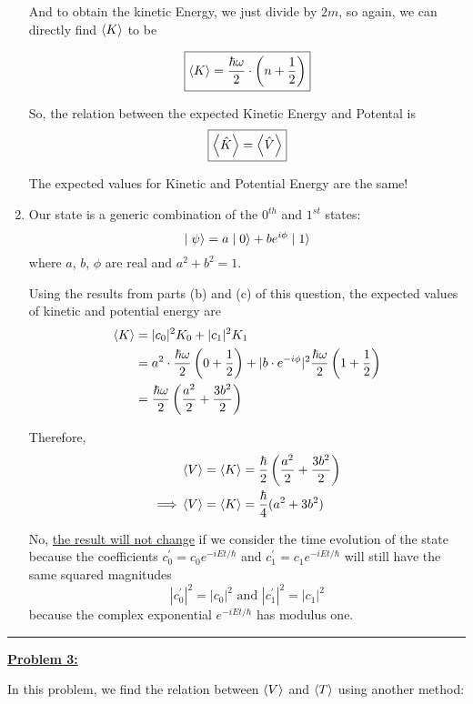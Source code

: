 \documentclass[twoside]{article}
\begin{document}
\begin{enumerate}
   And to obtain the kinetic Energy, we just divide by $2m$, so again, we can directly find $\left\langle K \right\rangle$ to be 

   \[ \boxed{\left\langle K \right\rangle = \frac{\hbar\omega}{2} \cdot \left( n + \frac{1}{2} \right)} \]

   So, the relation between the expected Kinetic Energy and Potental is 
   \[ \boxed{\left\langle \hat{K} \right\rangle =  \left\langle \hat{V} \right\rangle }\]

   The expected values for Kinetic and Potential Energy are the same!
   \vskip 1cm

   \item Our state is a generic combination of the $0^{th}$ and $1^{st}$ states:
   \[ \mid\psi\rangle = a\mid0\rangle + be^{i\phi}\mid1\rangle \]
   where $a$, $b$, $\phi$ are real and $a^2 + b^2 = 1$.

   Using the results from parts (b) and (c) of this question, the expected values of kinetic and potential energy are
   \begin{align*}
      \left\langle K \right\rangle &= |c_0|^2 K_0 + |c_1|^2 K_1 \\
      &= a^2 \cdot \frac{\hbar\omega}{2} \left(0 + \frac{1}{2}\right) + |b \cdot e^{-i\phi}|^2 \frac{\hbar\omega}{2} \left(1 + \frac{1}{2}\right) \\
      &= \frac{\hbar\omega}{2} \left( \frac{a^2}{2} + \frac{3b^2}{2} \right)
   \end{align*}

   Therefore,
   \begin{align*}
      &\left\langle V \right\rangle = \left\langle K \right\rangle = \frac{\hbar}{2}\left( \frac{a^2}{2} + \frac{3b^2} {2} \right) \\
      \implies&\left\langle V \right\rangle = \left\langle K \right\rangle = \frac{\hbar}{4} (a^2 + 3b^2)
   \end{align*}

   No, \underline{the result will not change} if we consider the time evolution of the state because the coefficients $c_0^{'} = c_0 e^{-iEt/ \hbar}$ and $c_1^{'} = c_1 e^{-iEt/ \hbar}$ will still have the same squared magnitudes 
   \[ |c_0^{'}|^2 = |c_0|^2\text{   and   }|c_1^{'}|^2 = |c_1|^2 \]
   because the complex exponential $e^{-iEt/\hbar}$ has modulus one.
\end{enumerate}

\vskip 0.5cm
\hrule
\vskip 0.5cm


\underline{\textbf{Problem 3:}}

In this problem, we find the relation between $\left\langle V \right\rangle$ and $\left\langle T \right\rangle$ using another method:
\end{document}
